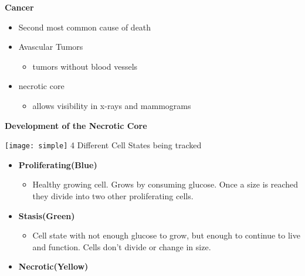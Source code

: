 \documentclass{article}
\newcommand\tab[1][1cm]{\hspace*{#1}}
\begin{document}
   \hspace{-1cm} %
   \begin{multicols}{2}
      \begin{center}\LARGE\textbf{Cancer}\end{center}
      \scriptsize
      \begin{itemize}
         \item Second most common cause of death
         \item Avascular Tumors
         \begin{itemize}
            \item tumors without blood vessels
         \end{itemize}
         \item necrotic core
         \begin{itemize}
            \item allows visibility in x-rays and mammograms
         \end{itemize}
      \end{itemize}
      \begin{center}\large\textbf{Development of the Necrotic Core}\end{center}
      \texttt{[image: simple]} %
      \scriptsize \tab 4 Different Cell States being tracked
      \begin{itemize}
         \item \textbf{Proliferating(Blue)}
         \begin{itemize}
            \item Healthy growing cell.  Grows by consuming glucose.  Once a size is reached they divide into two other proliferating cells.
         \end{itemize}
      \end{itemize}
      \begin{itemize}
         \item \textbf{Stasis(Green)}
         \begin{itemize}
            \item Cell state with not enough glucose to grow, but enough to continue to live and function.  Cells don't divide or change in size.
         \end{itemize}
      \end{itemize}
      \begin{itemize}
         \item \textbf{Necrotic(Yellow)}

\end{itemize}
\end{multicols}
\end{document}
